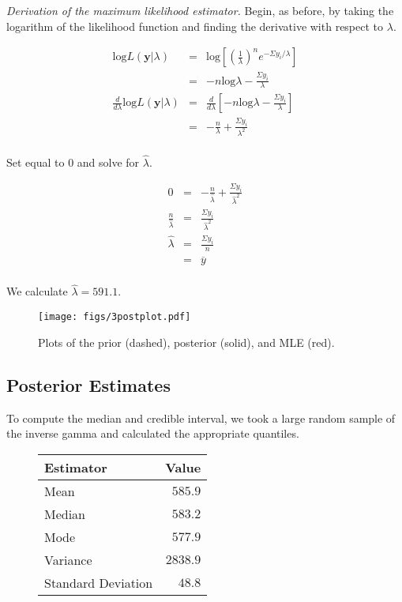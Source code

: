 \documentclass[12pt]{article}
\newcommand{\ybar}{\overline{y}}
\begin{document}
\noindent \emph{Derivation of the maximum likelihood estimator.} Begin, as before, by taking the logarithm of the likelihood function and finding the derivative with respect to $\lambda$.

\begin{eqnarray*}
\mathrm{log}L(\mathbf{y}|\lambda) &=& \mathrm{log}\left[\left(\frac{1}{\lambda}\right)^ne^{-\Sigma y_i/\lambda}\right] \\
&=& -n\mathrm{log}\lambda-\frac{\Sigma y_i}{\lambda} \\
\frac{d}{d\lambda}\mathrm{log}L(\mathbf{y}|\lambda) &=& \frac{d}{d\lambda}\left[-n\mathrm{log}\lambda-\frac{\Sigma y_i}{\lambda}\right] \\
&=& -\frac{n}{\lambda}+\frac{\Sigma y_i}{\lambda^2} \\
\end{eqnarray*}

\noindent Set equal to 0 and solve for $\hat{\lambda}$.

\begin{eqnarray*}
0 &=& -\frac{n}{\hat{\lambda}}+\frac{\Sigma y_i}{\hat{\lambda}^2} \\
\frac{n}{\hat{\lambda}} &=& \frac{\Sigma y_i}{\hat{\lambda}^2} \\
\hat{\lambda} &=& \frac{\Sigma y_i}{n} \\
&=& \ybar \\
\end{eqnarray*}

\noindent We calculate $\hat{\lambda}=591.1$.

\begin{figure}[H]
\begin{center}
\texttt{[image: figs/3postplot.pdf]}
\caption{Plots of the prior (dashed), posterior (solid), and MLE (red).}
\end{center}
\end{figure}

\subsection{Posterior Estimates}

\noindent To compute the median and credible interval, we took a large random sample of the inverse gamma and calculated the appropriate quantiles.

\begin{figure}[H]
\begin{center}
\begin{tabular}{l|r}
Estimator & \multicolumn{1}{l}{Value} \\ \hline \hline
Mean               & $585.9$ \\
Median             & $583.2$ \\
Mode               & $577.9$ \\
Variance           & $2838.9$ \\
Standard Deviation & $48.8$ \\
\end{tabular}
\end{center}
\end{figure}
\end{document}
